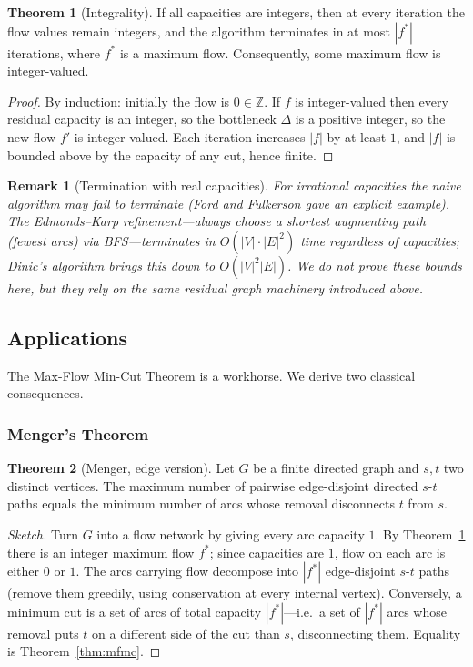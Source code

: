 \documentclass{article}
\newtheorem{remark}{Remark}
\theoremstyle{definition}
\newtheorem{theorem}{Theorem}
\begin{document}
\begin{theorem}[Integrality]\label{thm:integrality}
If all capacities are integers, then at every iteration the flow
values remain integers, and the algorithm terminates in at most
$|f^*|$ iterations, where $f^*$ is a maximum flow. Consequently,
some maximum flow is integer-valued.
\end{theorem}

\begin{proof}
By induction: initially the flow is $0 \in \mathbb{Z}$. If $f$ is
integer-valued then every residual capacity is an integer, so the
bottleneck $\Delta$ is a positive integer, so the new flow $f'$ is
integer-valued. Each iteration increases $|f|$ by at least $1$, and
$|f|$ is bounded above by the capacity of any cut, hence finite.
\end{proof}

\begin{remark}[Termination with real capacities]
For irrational capacities the naive algorithm may fail to terminate
(Ford and Fulkerson gave an explicit example). The Edmonds--Karp
refinement---always choose a \emph{shortest} augmenting path (fewest
arcs) via BFS---terminates in $O(|V| \cdot |E|^2)$ time regardless of
capacities; Dinic's algorithm brings this down to $O(|V|^2 |E|)$. We
do not prove these bounds here, but they rely on the same residual
graph machinery introduced above.
\end{remark}

\subsection{Applications}

The Max-Flow Min-Cut Theorem is a workhorse. We derive two classical
consequences.

\subsubsection{Menger's Theorem}

\begin{theorem}[Menger, edge version]
Let $G$ be a finite directed graph and $s, t$ two distinct vertices.
The maximum number of pairwise edge-disjoint directed $s$-$t$ paths
equals the minimum number of arcs whose removal disconnects $t$
from $s$.
\end{theorem}

\begin{proof}[Sketch]
Turn $G$ into a flow network by giving every arc capacity $1$. By
Theorem~\ref{thm:integrality} there is an integer maximum flow $f^*$;
since capacities are $1$, flow on each arc is either $0$ or $1$. The
arcs carrying flow decompose into $|f^*|$ edge-disjoint $s$-$t$ paths
(remove them greedily, using conservation at every internal vertex).
Conversely, a minimum cut is a set of arcs of total capacity
$|f^*|$---i.e.\ a set of $|f^*|$ arcs whose removal puts $t$ on a
different side of the cut than $s$, disconnecting them. Equality is
Theorem~\ref{thm:mfmc}.
\end{proof}
\end{document}

